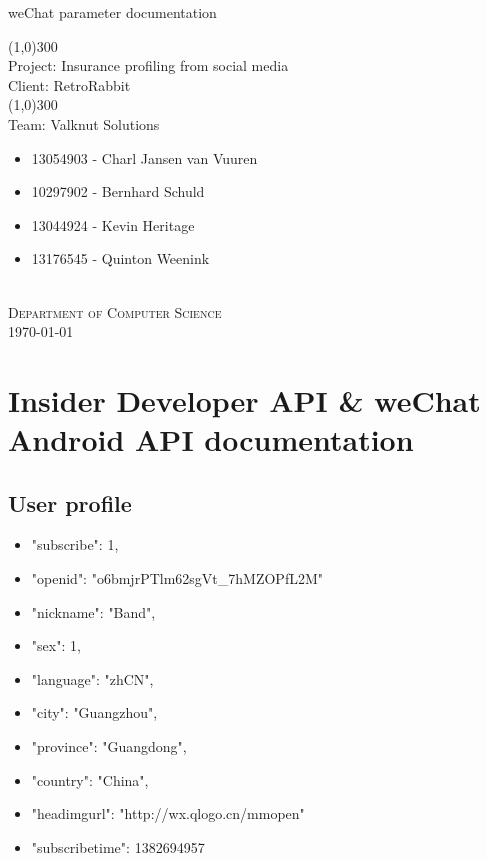 \documentclass{article}
\begin{document}
	\begin{titlepage}
		\begin{center}
			\huge{
			weChat parameter documentation\\
			}
			
			\line(1,0){300}\\
			[0.2cm]
			\LARGE{Project: Insurance profiling from social media\\
			Client: RetroRabbit} \\
			\line(1,0){300}\\
			\LARGE{Team: Valknut Solutions}\\
			[1.0cm]
			\large
			{
			\begin{itemize}
				\item 13054903 - Charl Jansen van Vuuren 
				\item 10297902 - Bernhard Schuld      
				\item 13044924 - Kevin Heritage
				\item 13176545 - Quinton Weenink\\
			\end{itemize}
			}
			\textsc{\large}\\
		[3.0cm]
		\textsc{\large  Department of Computer Science}\\
		[0.5cm]
		\textsc{\large \today}\\
		\end{center}

	\end{titlepage}
	\cleardoublepage
	\tableofcontents
\section{Insider Developer API & weChat Android API documentation}
\subsection{User profile}
\begin{itemize}
	\item "subscribe": 1, 
	\item "openid": "o6bmjrPTlm62sgVt\_7hMZOPfL2M"
	\item "nickname": "Band", 
	\item "sex": 1, 
	\item "language": "zhCN", 
	\item "city": "Guangzhou", 
	\item "province": "Guangdong", 
	\item "country": "China", 
	\item "headimgurl":    "http://wx.qlogo.cn/mmopen"
	\item "subscribetime": 1382694957
\end{itemize}
\end{document}
